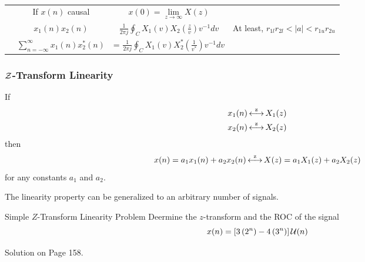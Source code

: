 \begin{table}[h!]
\begin{tabular}{p{4cm}ccp{5cm}}
    \nameref{subsubsec:Initial Value Theorem for Z-Transform} & If $x(n)$ causal & $x(0) = \lim\limits_{z \rightarrow \infty} X(z)$ & \\
    \nameref{subsubsec:Z-Transform 2 Sequence Multiplication} & $x_{1}(n)x_{2}(n)$ & $\frac{1}{2 \pi j} \oint_{C} X_{1}(v)X_{2}(\frac{z}{v}) v^{-1} dv$ & At least, $r_{1l}r_{2l} < \lvert a \rvert < r_{1u}r_{2u}$ \\
    \nameref{subsubsec:Parsevals Relation for Z-Transform} & $\sum\limits_{n=-\infty}^{\infty} x_{1}(n)x_{2}^{*}(n)$ &= $\frac{1}{2 \pi j} \oint_{C} X_{1}(v)X_{2}^{*}(\frac{1}{v^{*}})v^{-1} dv$ & \\
    \bottomrule
  \end{tabular}
  \caption{}
  \label{tab:Z-Transform Properties}
\end{table}

\subsubsection{\texorpdfstring{$\operatorname{\mathcal{Z}}$-Transform}{Z-Transform} Linearity}\label{subsubsec:Z-Transform Linearity}
If
\begin{equation*}
  \begin{aligned}
    x_{1}(n) &\operatorname{\overset{z}{\longleftrightarrow}} X_{1}(z) \\
    x_{2}(n) &\operatorname{\overset{z}{\longleftrightarrow}} X_{2}(z) \\
  \end{aligned}
\end{equation*}
then
\begin{equation}\label{eq:Z-Transform Linearity}
  x(n) = a_{1}x_{1}(n) + a_{2}x_{2}(n) \operatorname{\overset{z}{\longleftrightarrow}} X(z) = a_{1}X_{1}(z) + a_{2}X_{2}(z)
\end{equation}
for any constants $a_{1}$ and $a_{2}$.

The linearity property can be generalized to an arbitrary number of signals.

\begin{example}[Example 3.2.1]{Simple \texorpdfstring{$Z$-Transform}{Z-Transform} Linearity Problem}
  Deermine the $z$-transform and the ROC of the signal
  \begin{equation*}
    x(n) = \left[ 3 \left( 2^{n} \right) - 4 \left( 3^{n} \right) \right] \operatorname{\mathcal{U}}(n)
  \end{equation*}

  \tcblower

  Solution on Page 158.
\end{example}

